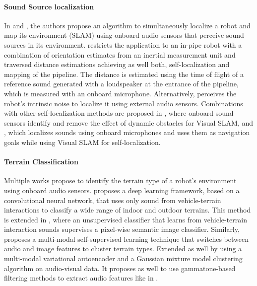 \paragraph{Sound Source localization} \label{para:sound-source-localization} In
\cite{AcousticSLAM} and \cite{SoundSourceMapping}, the authors propose an
algorithm to simultaneously localize a robot and map its environment (SLAM)
using onboard audio sensors that perceive sound sources in its environment.
\cite{SnakeSound} restricts the application to an in-pipe robot with a
combination of orientation estimates from an inertial measurement unit and
traversed distance estimations achieving as well both, self-localization and
mapping of the pipeline. The distance is estimated using the time of flight of
a reference sound generated with a loudspeaker at the entrance of the pipeline,
which is measured with an onboard microphone. Alternatively, \cite{Allen2012}
perceives the robot's intrinsic noise to localize it using external audio
sensors. Combinations with other self-localization methods are proposed in
\cite{AcousticFusion}, where onboard sound sensors identify and remove the
effect of dynamic obstacles for Visual SLAM, and \cite{Gautam2014}, which
localizes sounds using onboard microphones and uses them as navigation goals
while using Visual SLAM for self-localization.


\paragraph{Terrain Classification} \label{para:terrain-classification} Multiple
works propose to identify the terrain type of a robot's environment using
onboard audio sensors. \cite{Valada2018} proposes a deep learning framework,
based on a convolutional neural network, that uses only sound from
vehicle-terrain interactions to classify a wide range of indoor and outdoor
terrains. This method is extended in \cite{DeepTerrain}, where an unsupervised
classifier that learns from vehicle-terrain interaction sounds supervises a
pixel-wise semantic image classifier. Similarly, \cite{Kurobe2021} proposes a
multi-modal self-supervised learning technique that switches between audio and
image features to cluster terrain types. Extended as well by
\cite{Ishikawa2021} using a multi-modal variational autoencoder and a Gaussian
mixture model clustering algorithm on audio-visual data. It proposes as well to
use gammatone-based filtering methods to extract audio features like in
\cite{marchegiani2018a}.
